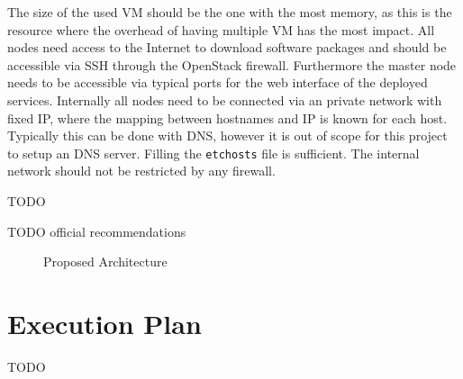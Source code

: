 The size of the used \acs{VM} should be the one with the most memory, 
as this is the resource where the overhead of having multiple \acs{VM} has the most impact.
All nodes need access to the Internet to download software packages and should be accessible via \ac{SSH} through the OpenStack firewall.
Furthermore the master node needs to be accessible via typical ports for the web interface of the deployed services.
Internally all nodes need to be connected via an private network with fixed \acs{IP}, where the mapping between hostnames and \acs{IP} is known for each host. Typically this can be done with \ac{DNS}, however it is out of scope for this project to setup an \ac{DNS} server. Filling the \texttt{\/etc\/hosts} file is sufficient.
The internal network should not be restricted by any firewall.

TODO


TODO official recommendations


\begin{figure}
	\caption[]{\label{fig:architecture}Proposed Architecture}
\end{figure}



\section{Execution Plan}

TODO
